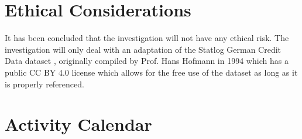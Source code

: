 \documentclass[11pt]{article}
\begin{document}
\section{Ethical Considerations}

It has been concluded that the investigation will not have any ethical risk. The investigation will only deal with an adaptation \cite{germancredit2026} of the Statlog German Credit Data dataset \cite{hofmann1994german}, originally compiled by Prof. Hans Hofmann in 1994 which has a public CC BY 4.0 license which allows for the free use of the dataset as long as it is properly referenced.
\section{Activity Calendar}
\end{document}
